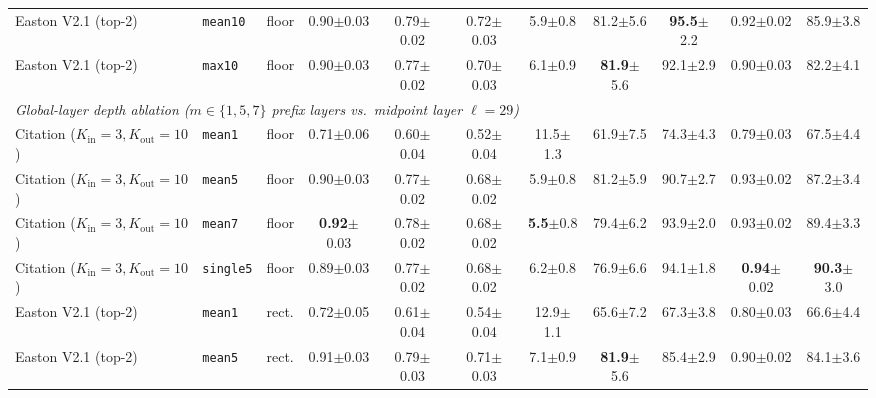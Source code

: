 \begin{table}[t]
{\begin{tabular}{lllcccccccc}
Easton V2.1 (top-2) & \texttt{mean10} & floor & 0.90{\scriptsize$\pm$0.03} & 0.79{\scriptsize$\pm$0.02} & 0.72{\scriptsize$\pm$0.03} & 5.9{\scriptsize$\pm$0.8} & 81.2{\scriptsize$\pm$5.6} & \textbf{95.5}{\scriptsize$\pm$2.2} & 0.92{\scriptsize$\pm$0.02} & 85.9{\scriptsize$\pm$3.8} \\
Easton V2.1 (top-2) & \texttt{max10} & floor & 0.90{\scriptsize$\pm$0.03} & 0.77{\scriptsize$\pm$0.02} & 0.70{\scriptsize$\pm$0.03} & 6.1{\scriptsize$\pm$0.9} & \textbf{81.9}{\scriptsize$\pm$5.6} & 92.1{\scriptsize$\pm$2.9} & 0.90{\scriptsize$\pm$0.03} & 82.2{\scriptsize$\pm$4.1} \\
\midrule
\multicolumn{11}{l}{\emph{Global-layer depth ablation ($m \in \{1, 5, 7\}$ prefix layers vs.\ midpoint layer $\ell = 29$)}} \\
Citation ($K_{\mathrm{in}}{=}3, K_{\mathrm{out}}{=}10$) & \texttt{mean1} & floor & 0.71{\scriptsize$\pm$0.06} & 0.60{\scriptsize$\pm$0.04} & 0.52{\scriptsize$\pm$0.04} & 11.5{\scriptsize$\pm$1.3} & 61.9{\scriptsize$\pm$7.5} & 74.3{\scriptsize$\pm$4.3} & 0.79{\scriptsize$\pm$0.03} & 67.5{\scriptsize$\pm$4.4} \\
Citation ($K_{\mathrm{in}}{=}3, K_{\mathrm{out}}{=}10$) & \texttt{mean5} & floor & 0.90{\scriptsize$\pm$0.03} & 0.77{\scriptsize$\pm$0.02} & 0.68{\scriptsize$\pm$0.02} & 5.9{\scriptsize$\pm$0.8} & 81.2{\scriptsize$\pm$5.9} & 90.7{\scriptsize$\pm$2.7} & 0.93{\scriptsize$\pm$0.02} & 87.2{\scriptsize$\pm$3.4} \\
Citation ($K_{\mathrm{in}}{=}3, K_{\mathrm{out}}{=}10$) & \texttt{mean7} & floor & \textbf{0.92}{\scriptsize$\pm$0.03} & 0.78{\scriptsize$\pm$0.02} & 0.68{\scriptsize$\pm$0.02} & \textbf{5.5}{\scriptsize$\pm$0.8} & 79.4{\scriptsize$\pm$6.2} & 93.9{\scriptsize$\pm$2.0} & 0.93{\scriptsize$\pm$0.02} & 89.4{\scriptsize$\pm$3.3} \\
Citation ($K_{\mathrm{in}}{=}3, K_{\mathrm{out}}{=}10$) & \texttt{single5} & floor & 0.89{\scriptsize$\pm$0.03} & 0.77{\scriptsize$\pm$0.02} & 0.68{\scriptsize$\pm$0.02} & 6.2{\scriptsize$\pm$0.8} & 76.9{\scriptsize$\pm$6.6} & 94.1{\scriptsize$\pm$1.8} & \textbf{0.94}{\scriptsize$\pm$0.02} & \textbf{90.3}{\scriptsize$\pm$3.0} \\
Easton V2.1 (top-2) & \texttt{mean1} & rect. & 0.72{\scriptsize$\pm$0.05} & 0.61{\scriptsize$\pm$0.04} & 0.54{\scriptsize$\pm$0.04} & 12.9{\scriptsize$\pm$1.1} & 65.6{\scriptsize$\pm$7.2} & 67.3{\scriptsize$\pm$3.8} & 0.80{\scriptsize$\pm$0.03} & 66.6{\scriptsize$\pm$4.4} \\
Easton V2.1 (top-2) & \texttt{mean5} & rect. & 0.91{\scriptsize$\pm$0.03} & 0.79{\scriptsize$\pm$0.03} & 0.71{\scriptsize$\pm$0.03} & 7.1{\scriptsize$\pm$0.9} & \textbf{81.9}{\scriptsize$\pm$5.6} & 85.4{\scriptsize$\pm$2.9} & 0.90{\scriptsize$\pm$0.02} & 84.1{\scriptsize$\pm$3.6} \\

\end{tabular}}
\end{table}
